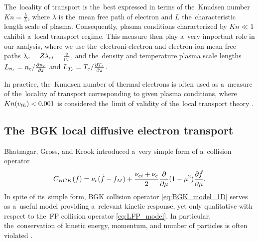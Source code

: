 The~locality of transport is the~best expressed in terms of the~Knudsen number
$Kn=\frac{\lambda}{L}$, where $\lambda$ is the~mean free path of electron and
$L$ the~characteristic length scale of plasma. Consequently, plasma conditions
characterized by $Kn\ll1$ exhibit a~local transport regime. This measure then
play a~very important role in our analysis, where we use the~electroni-electron
and electron-ion mean free paths $\lambda_e = Z\lambda_{ei} = \frac{v}{\nu_{e}}$,
and the~density and temperature plasma scale lengths 
$L_{n_e} = n_e/\frac{\partial{n_e}}{\partial{z}}$ and $L_{T_e} = T_e/\frac{\partial{T_e}}{\partial{z}}$.

In practice, the~Knudsen number of thermal electrons is often used as 
a~measure of the~locality of transport corresponding to given plasma conditions,
where $Kn(v_{th})<0.001$ is considered the~limit of validity of 
the~local transport theory \cite{LMV_1983_7}.


\subsection{The~BGK local diffusive electron transport}
\label{sec:BGKDiffusiveRegime}

Bhatnagar, Gross, and Krook  introduced a~very simple form
of a~collision operator \cite{BGK_1954}
\begin{equation}
  C_{BGK}(\tilde{f})
  =
  \nu_{e}(\tilde{f} - f_M)
  + \frac{\nu_{ei} + \nu_{e}}{2}
  \frac{\partial{}}{\partial{\mu}}(1 - \mu^2)\frac{\partial{\tilde{f}}}{\partial{\mu}} .
  \label{eq:BGK_model_1D}
\end{equation}
In spite of its~simple form, BGK collision operator \eqref{eq:BGK_model_1D} 
serves as a~useful model providing a~relevant kinetic response, yet only 
qualitative with respect to the~FP collision operator \eqref{eq:LFP_model}.
In particular, the~conservation of kinetic energy, momentum, 
and number of particles is often violated 
\cite{Shkarofsky_Particle_Kinetics_book_1966_24}.


